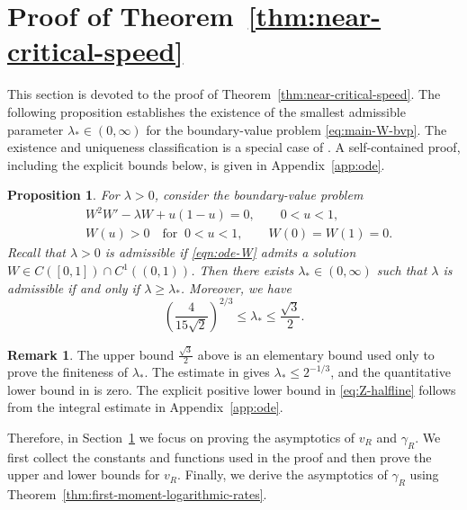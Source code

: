 \documentclass[12pt]{amsart}
\numberwithin{equation}{section}
\theoremstyle{plain}
\newtheorem{proposition}[theorem]{Proposition}
\theoremstyle{definition}
\newtheorem{remark}[theorem]{Remark}
\begin{document}
\section{Proof of Theorem~\ref{thm:near-critical-speed}}
\label{sec:two-sided-barriers}

This section is devoted to the proof of
Theorem~\ref{thm:near-critical-speed}. The following proposition establishes
the existence of the smallest admissible parameter
$\lambda_*\in(0,\infty)$ for the boundary-value problem
\eqref{eq:main-W-bvp}. The existence and uniqueness classification is a
special case of \cite[Proposition~2]{EnguicaGavioliSanchez2013}.
A self-contained proof, including the explicit bounds below, is given in
Appendix~\ref{app:ode}.
\begin{proposition}
\label{prop:Cstar-halfline}
For $\lambda>0$, consider the boundary-value problem
\begin{equation}\label{eqn:ode-W}
\begin{aligned}
 &W^2W'-\lambda W+u(1-u)=0,\qquad 0<u<1,\\
 &W(u)>0\quad\text{for }\ 0<u<1, \qquad
 W(0)=W(1)=0.
\end{aligned}
\end{equation}
Recall that $\lambda>0$ is \emph{admissible} if \eqref{eqn:ode-W} admits a solution
$W\in C([0,1])\cap C^1((0,1))$.
Then there exists $\lambda_*\in(0,\infty)$ such that $\lambda$ is admissible
if and only if $\lambda\ge\lambda_*$. Moreover, we have
\begin{equation}\label{eq:Z-halfline}
    \left(\frac{4}{15\sqrt2}\right)^{2/3} \le \lambda_* \le \frac{\sqrt{3}}{2}.
\end{equation}
\end{proposition}
\begin{remark}
  The upper bound $\frac{\sqrt3}{2}$ above is an elementary bound used only to prove the finiteness of $\lambda_*$.
 The estimate in
\cite[Proposition~2]{EnguicaGavioliSanchez2013} gives
\( \lambda_*\le2^{-1/3}\), and the quantitative lower bound in
\cite[Lemma~3.1(a)]{EnguicaGavioliSanchez2013} is zero.
The explicit positive lower bound in \eqref{eq:Z-halfline} follows from
the integral estimate in Appendix~\ref{app:ode}.
\end{remark}
Therefore, in Section~\ref{sec:two-sided-barriers} we focus on proving the asymptotics of $v_R$ and $\gamma_R$.
We first collect the constants and
functions used in the proof and then prove the upper and lower bounds for $v_R$.
Finally, we derive the asymptotics of $\gamma_R$ using Theorem~\ref{thm:first-moment-logarithmic-rates}.
\end{document}
